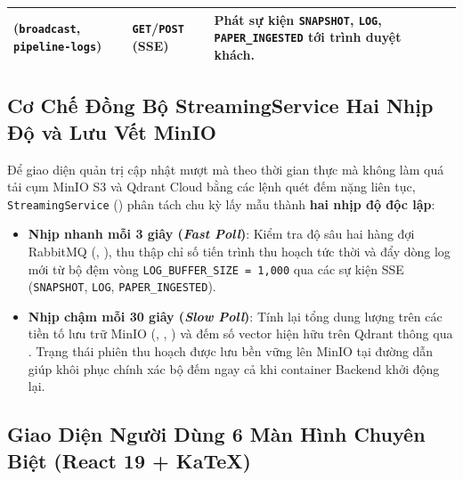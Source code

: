 \begin{table}[htbp]
\begin{tabularx}{\linewidth}{|>{\raggedright\arraybackslash}p{42mm}|>{\centering\arraybackslash}p{22mm}|L|>{\raggedright\arraybackslash}p{30mm}|}
    \hline
     (\texttt{broadcast}, \texttt{pipeline-logs}) & \texttt{GET}/\texttt{POST} (SSE) & Phát sự kiện \texttt{SNAPSHOT}, \texttt{LOG}, \texttt{PAPER\_INGESTED} tới trình duyệt khách. &  \\
    \hline
  \end{tabularx}
\end{table}

\subsection{Cơ Chế Đồng Bộ StreamingService Hai Nhịp Độ và Lưu Vết MinIO}
\label{sec:ch6_streaming}

Để giao diện quản trị cập nhật mượt mà theo thời gian thực mà không làm quá tải cụm MinIO S3 và Qdrant Cloud bằng các lệnh quét đếm nặng liên tục, \texttt{StreamingService} () phân tách chu kỳ lấy mẫu thành \textbf{hai nhịp độ độc lập}:
\begin{itemize}
  \item \textbf{Nhịp nhanh mỗi 3 giây (\textit{Fast Poll})}: Kiểm tra độ sâu hai hàng đợi RabbitMQ (, ), thu thập chỉ số tiến trình thu hoạch tức thời và đẩy dòng log mới từ bộ đệm vòng \texttt{LOG\_BUFFER\_SIZE = 1,000} qua các sự kiện SSE (\texttt{SNAPSHOT}, \texttt{LOG}, \texttt{PAPER\_INGESTED}).
  \item \textbf{Nhịp chậm mỗi 30 giây (\textit{Slow Poll})}: Tính lại tổng dung lượng trên các tiền tố lưu trữ MinIO (, , ) và đếm số vector hiện hữu trên Qdrant thông qua . Trạng thái phiên thu hoạch được lưu bền vững lên MinIO tại đường dẫn  giúp khôi phục chính xác bộ đếm ngay cả khi container Backend khởi động lại.
\end{itemize}

\subsection{Giao Diện Người Dùng 6 Màn Hình Chuyên Biệt (React 19 + KaTeX)}
\label{sec:ch6_frontend}

